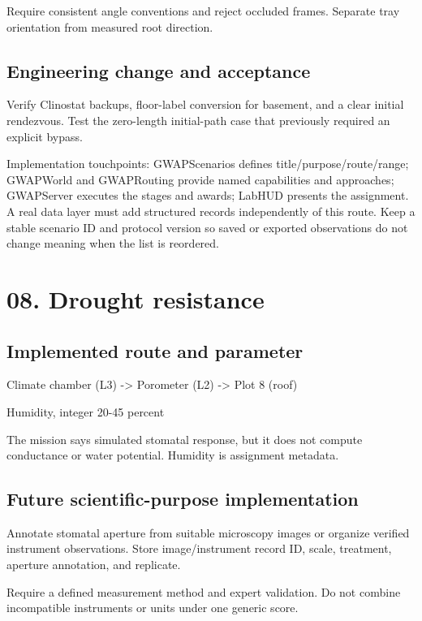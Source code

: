 Require consistent angle conventions and reject occluded frames.\allowbreak{} Separate tray orientation from measured root direction.\allowbreak{}

\subsection{Engineering change and acceptance}
Verify Clinostat backups, floor-label conversion for basement, and a clear initial rendezvous.\allowbreak{} Test the zero-length initial-path case that previously required an explicit bypass.\allowbreak{}

Implementation touchpoints: GWAPScenarios defines title/\allowbreak{}purpose/\allowbreak{}route/\allowbreak{}range; GWAPWorld and GWAPRouting provide named capabilities and approaches; GWAPServer executes the stages and awards; LabHUD presents the assignment.\allowbreak{} A real data layer must add structured records independently of this route.\allowbreak{} Keep a stable scenario ID and protocol version so saved or exported observations do not change meaning when the list is reordered.\allowbreak{}

\section{08.\allowbreak{} Drought resistance}
\subsection{Implemented route and parameter}
Climate chamber (L3) -> Porometer (L2) -> Plot 8 (roof)

Humidity, integer 20-45 percent

The mission says simulated stomatal response, but it does not compute conductance or water potential.\allowbreak{} Humidity is assignment metadata.\allowbreak{}

\subsection{Future scientific-purpose implementation}
Annotate stomatal aperture from suitable microscopy images or organize verified instrument observations.\allowbreak{} Store image/\allowbreak{}instrument record ID, scale, treatment, aperture annotation, and replicate.\allowbreak{}

Require a defined measurement method and expert validation.\allowbreak{} Do not combine incompatible instruments or units under one generic score.\allowbreak{}

